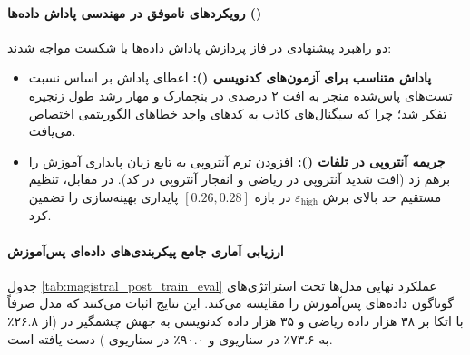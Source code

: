 \paragraph*{رویکردهای ناموفق در مهندسی پاداش داده‌ها ()}
دو راهبرد پیشنهادی در فاز پردازش پاداش داده‌ها با شکست مواجه شدند:
\begin{itemize}
    \item \textbf{پاداش متناسب برای آزمون‌های کدنویسی ():} اعطای پاداش بر اساس نسبت تست‌های پاس‌شده منجر به افت ۲ درصدی در بنچمارک  و مهار رشد طول زنجیره تفکر شد؛ چرا که سیگنال‌های کاذب به کدهای واجد خطاهای الگوریتمی اختصاص می‌یافت.
    \item \textbf{جریمه آنتروپی در تلفات ():} افزودن ترم آنتروپی به تابع زیان پایداری آموزش را برهم زد (افت شدید آنتروپی در ریاضی و انفجار آنتروپی در کد). در مقابل، تنظیم مستقیم حد بالای برش $\varepsilon_{\text{high}}$ در بازه $[0.26, 0.28]$ پایداری بهینه‌سازی را تضمین کرد.
\end{itemize}

\paragraph*{ارزیابی آماری جامع پیکربندی‌های داده‌ای پس‌آموزش}
جدول \ref{tab:magistral_post_train_eval} عملکرد نهایی مدل‌ها تحت استراتژی‌های گوناگون داده‌های پس‌آموزش را مقایسه می‌کند. این نتایج اثبات می‌کنند که مدل  صرفاً با اتکا بر ۳۸ هزار داده ریاضی و ۳۵ هزار داده کدنویسی به جهش چشمگیر در  (از ۲۶.۸٪ به ۷۳.۶٪ در سناریوی  و ۹۰.۰٪ در سناریوی ) دست یافته است.

\begin{table}[htbp]
\centering
\caption{مقایسه عملکردی مدل‌های  بر اساس پیکربندی‌های مختلف داده‌های پس‌آموزش}
\label{tab:magistral_post_train_eval}
\end{table}